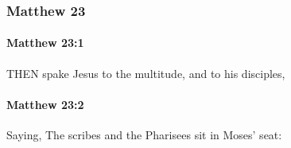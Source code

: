 	\subsubsection{Matthew 23} %
		\label{MATTHEW-23}
		
		\paragraph{Matthew 23:1} %
			\label{MATTHEW-23-1}

			THEN spake Jesus to the multitude, and to his disciples,

			\begin{framed}
			\scriptsize
				\begin{compactdesc}
					\item[SBLG] 
				\end{compactdesc}
			\end{framed}

		\paragraph{Matthew 23:2} %
			\label{MATTHEW-23-2}

			Saying, The scribes and the Pharisees sit in Moses' seat:

